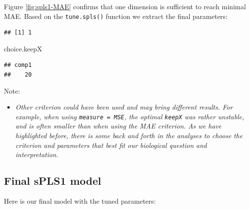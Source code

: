 \documentclass[]{book}
\newenvironment{Shaded}{\begin{snugshade}}{\end{snugshade}}
\newcommand{\DecValTok}[1]{\textcolor[rgb]{0.00,0.00,0.81}{#1}}
\newcommand{\StringTok}[1]{\textcolor[rgb]{0.31,0.60,0.02}{#1}}
\newcommand{\CommentTok}[1]{\textcolor[rgb]{0.56,0.35,0.01}{\textit{#1}}}
\newcommand{\OperatorTok}[1]{\textcolor[rgb]{0.81,0.36,0.00}{\textbf{#1}}}
\newcommand{\NormalTok}[1]{#1}
\providecommand{\tightlist}{%
  \setlength{\itemsep}{0pt}\setlength{\parskip}{0pt}}
\begin{document}
Figure \ref{fig:spls1-MAE} confirms that one dimension is sufficient to
reach minimal MAE. Based on the \texttt{tune.spls()} function we extract
the final parameters:

\begin{Shaded}
\end{Shaded}

\begin{verbatim}
## [1] 1
\end{verbatim}

\begin{Shaded}
\begin{Highlighting}[]
\NormalTok{choice.keepX}
\end{Highlighting}
\end{Shaded}

\begin{verbatim}
## comp1 
##    20
\end{verbatim}

Note:

\begin{itemize}
\tightlist
\item
  \emph{Other criterion could have been used and may bring different
  results. For example, when using
  \texttt{measure\ =\ \textquotesingle{}MSE\textquotesingle{}}, the
  optimal \texttt{keepX} was rather unstable, and is often smaller than
  when using the MAE criterion. As we have highlighted before, there is
  some back and forth in the analyses to choose the criterion and
  parameters that best fit our biological question and interpretation.}
\end{itemize}

\subsection{Final sPLS1 model}\label{final-spls1-model}

Here is our final model with the tuned parameters:
\end{document}
